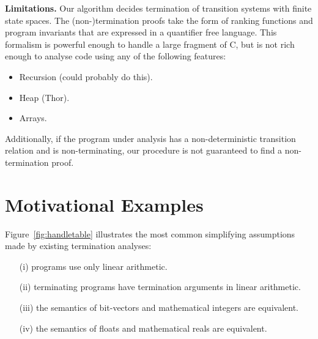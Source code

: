 \documentclass[preprint]{sigplanconf}
\theoremstyle{definition}
\begin{document}






{\bf Limitations.}
Our algorithm decides termination of transition systems with finite state
spaces.  The (non-)termination proofs take the form of ranking functions and
program invariants that are expressed in a quantifier free language.  This
formalism is powerful enough to handle a large fragment of C, but is not
rich enough to analyse code using any of the following features:

\begin{itemize}
\item Recursion (could probably do this).
\item Heap (Thor).
\item Arrays.
\end{itemize}

Additionally, if the program under analysis has a non-deterministic transition relation
and is non-terminating, our procedure is not guaranteed to find a non-termination proof.

\section{Motivational Examples} \label{sec:motivation}

Figure~\ref{fig:handletable} illustrates the most common simplifying
assumptions made by existing termination analyses:
%
\begin{itemize}
\item[(i)] programs use only linear arithmetic.
\item[(ii)] terminating programs have termination arguments in linear arithmetic.
\item[(iii)] the semantics of bit-vectors and mathematical integers are equivalent.
\item[(iv)] the semantics of floats and mathematical reals are equivalent.
\end{itemize}  
\end{document}
